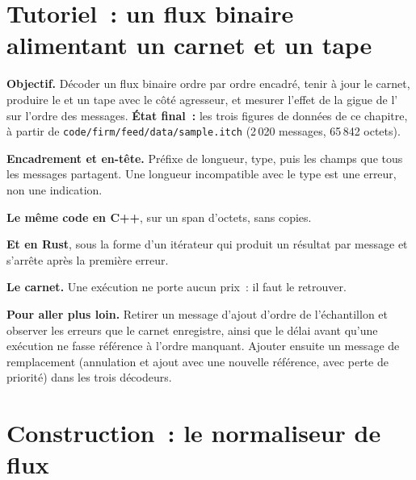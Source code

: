 \section{Tutoriel~: un flux binaire alimentant un carnet et un tape}\label{tut:m1:reading-market-data:decode}

\begin{tutorial}
\textbf{Objectif.} Décoder un flux binaire ordre par ordre encadré, tenir à jour le carnet,
produire le  et un tape avec le côté agresseur, et mesurer l'effet de la gigue de
l' sur l'ordre des messages. \textbf{État final~:} les trois figures de
données de ce chapitre, à partir de \texttt{code/firm/feed/data/sample.itch} (2\,020 messages,
65\,842 octets).
\begin{tutsteps}
\item \textbf{Encadrement et en-tête.} Préfixe de longueur, type, puis les champs que
tous les messages partagent. Une longueur incompatible avec le type est une erreur, non
une indication.
\label{lst:m1:reading-market-data:py}
\item \textbf{Le même code en C++}, sur un span d'octets, sans copies.
\label{lst:m1:reading-market-data:cpp}
\item \textbf{Et en Rust}, sous la forme d'un itérateur qui produit un résultat par message
et s'arrête après la première erreur.
\label{lst:m1:reading-market-data:rs}
\item \textbf{Le carnet.} Une exécution ne porte aucun prix~: il faut le retrouver.
\label{lst:m1:reading-market-data:apply}
\end{tutsteps}
\textbf{Pour aller plus loin.} Retirer un message d'ajout d'ordre de l'échantillon et
observer les erreurs que le carnet enregistre, ainsi que le délai avant qu'une exécution
ne fasse référence à l'ordre manquant. Ajouter ensuite un message de remplacement (annulation
et ajout avec une nouvelle référence, avec perte de priorité) dans les trois décodeurs.
\end{tutorial}

\section{Construction~: le normaliseur de flux}\label{bld:m1:reading-market-data:feed}

